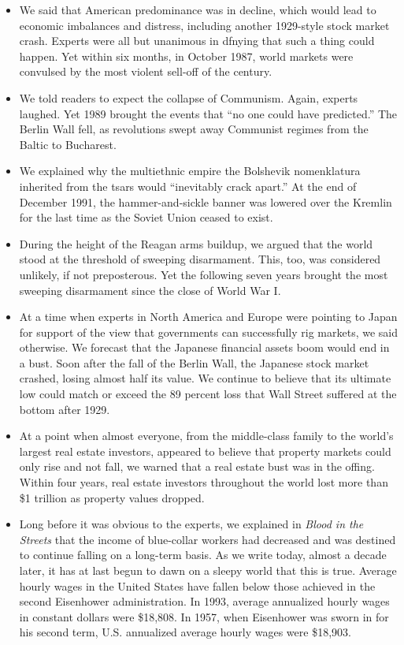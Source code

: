 \begin{paracol}{2}
\switchcolumn
\begin{itemize}
\item We said that American predominance was in decline, which would lead to economic imbalances and distress, including another 1929-style stock market crash. Experts were all but unanimous in dfnying that such a thing could happen. Yet within six months, in October 1987, world markets were convulsed by the most violent sell-off of the century.
\item We told readers to expect the collapse of Communism. Again, experts laughed. Yet 1989 brought the events that ``no one could have predicted.'' The Berlin Wall fell, as revolutions swept away Communist regimes from the Baltic to Bucharest.
\item We explained why the multiethnic empire the Bolshevik nomenklatura inherited from the tsars would ``inevitably crack apart.'' At the end of December 1991, the hammer-and-sickle banner was lowered over the Kremlin for the last time as the Soviet Union ceased to exist.
\item During the height of the Reagan arms buildup, we argued that the world stood at the threshold of sweeping disarmament. This, too, was considered unlikely, if not preposterous. Yet the following seven years brought the most sweeping disarmament since the close of World War I.
\item At a time when experts in North America and Europe were pointing to Japan for support of the view that governments can successfully rig markets, we said otherwise. We forecast that the Japanese financial assets boom would end in a bust. Soon after the fall of the Berlin Wall, the Japanese stock market crashed, losing almost half its value. We continue to believe that its ultimate low could match or exceed the 89 percent loss that Wall Street suffered at the bottom after 1929. 
\item At a point when almost everyone, from the middle-class family to the world's largest real estate investors, appeared to believe that property markets could only rise and not fall, we warned that a real estate bust was in the offing. Within four years, real estate investors throughout the world lost more than \$1 trillion as property values dropped. 
\item Long before it was obvious to the experts, we explained in \emph{Blood in the Streets} that the income of blue-collar workers had decreased and was destined to continue falling on a long-term basis. As we write today, almost a decade later, it has at last begun to dawn on a sleepy world that this is true. Average hourly wages in the United States have fallen below those achieved in the second Eisenhower administration. In 1993, average annualized hourly wages in constant dollars were \$18,808. In 1957, when Eisenhower was sworn in for his second term, U.S. annualized average hourly wages were \$18,903.
\end{itemize}


\end{paracol}
